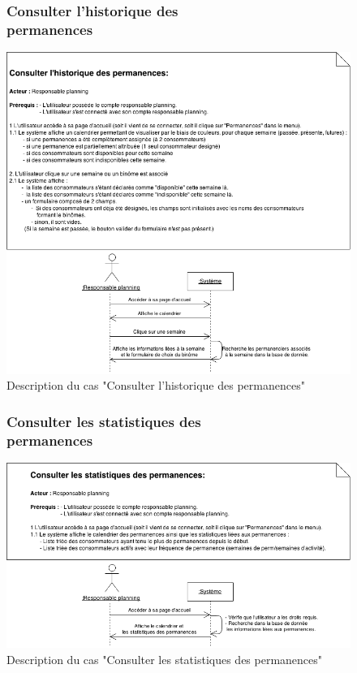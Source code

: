 \documentclass[12pt]{report}
\begin{document}
\begin{figure}[!h]
\centering
\subsubsection{Consulter l'historique des permanences~~~~~~~~~~~~~~~~~~~~~~~~~~~}
\includegraphics[width=1.\textwidth]{./ressources/desc_UC_voir_permanences.png}
\caption{Description du cas "Consulter l'historique des permanences"}
\end{figure}
\clearpage

\begin{figure}[!h]
\centering
\subsubsection{Consulter les statistiques des permanences~~~~~~~~~~~~~~~~~~~~~~~~~~~}
\includegraphics[width=1.\textwidth]{./ressources/desc_UC_stats_permanences.png}
\caption{Description du cas "Consulter les statistiques des permanences"}
\end{figure}
\clearpage
\end{document}
